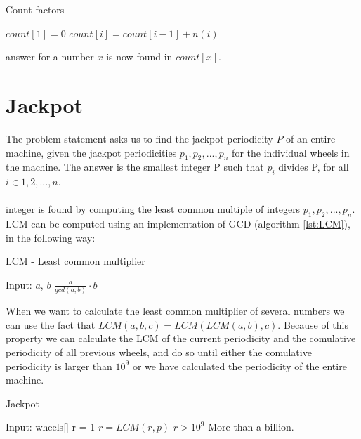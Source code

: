 \documentclass[11pt,a4paper,twoside]{article}
\begin{document}

\begin{algorithm}
    \caption{Count factors}
    \label{factorcount}
    \begin{algorithmic}
        \STATE $count[1] = 0$
            \STATE $count[i] = count[i-1] + n(i)$
        \ENDFOR
    \end{algorithmic}
\end{algorithm}

 answer for a number $x$ is now found in $count[x]$.


\section{Jackpot}

The problem statement asks us to find the jackpot periodicity $P$ of an entire
machine, given the jackpot periodicities $p_{1},p_{2},...,p_{n}$ for the
individual wheels in the machine. The answer is the smallest integer P such
that $p_{i}$ divides P, for all $i \in {1,2,...,n}$.
\\\\
 integer is found by computing the least common multiple of
integers $p_{1},p_{2},...,p_{n}$. LCM can be computed using an implementation
of GCD (algorithm \ref{lst:LCM}), in the following way:

\begin{algorithm}
    \caption{LCM - Least common multiplier}
    \label{lst:LCM}
    \begin{algorithmic}
        \REQUIRE Input: $a$, $b$
        \RETURN $ \frac{a}{gcd(a, b)} \cdot b$
    \end{algorithmic}
\end{algorithm}

When we want to calculate the least common multiplier of several numbers we can
use the fact that $LCM(a, b, c) = LCM(LCM(a, b), c)$. Because of this property
we can calculate the LCM of the current periodicity and the comulative
periodicity of all previous wheels, and do so until either the comulative
periodicity is larger than $10^9$ or we have calculated the periodicity of the
entire machine.

\begin{algorithm}
    \caption{Jackpot}
    \label{lst:jackpot}
    \begin{algorithmic}
        \REQURE Input: wheels[] 
        \STATE r = 1
            \STATE $r = LCM(r, p)$
            \IF $r > 10^9$
                \PRINT More than a billion.
            \ENDIF
        \ENDFOR
    \end{algorithmic}
\end{algorithm}
\end{document}
